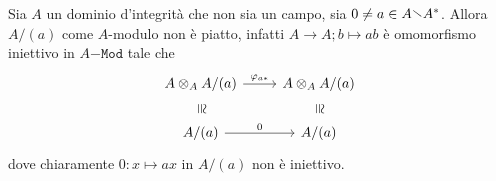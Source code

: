 \begin{example}{}
    Sia \(A\) un dominio d'integrità che non sia un campo, sia \(0 \neq a \in A
    \sminus A^{*}\). Allora \(A / (a)\) come \(A\)-modulo non è piatto, infatti
    \(A \to A ; b \mapsto ab\) è omomorfismo iniettivo in \(A\mathtt{-Mod}\)
    tale che 
    \[ \begin{tikzcd}
	A \otimes_A A / (a) & A \otimes_A A / (a) \\
	A / (a) & A / (a)
	\arrow["{\varphi_{a*}}", from=1-1, to=1-2]
	\arrow["\cong"{marking, allow upside down}, draw=none, from=1-1, to=2-1]
	\arrow["\cong"{marking, allow upside down}, draw=none, from=1-2, to=2-2]
	\arrow["0", from=2-1, to=2-2]
\end{tikzcd} \]
    dove chiaramente \(0 : x \mapsto ax\) in \(A / (a)\) non è iniettivo.
\end{example}

